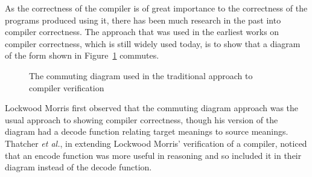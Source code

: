 \documentclass[a4paper,12pt]{article}
\begin{document}
As the correctness of the compiler is of great importance to the correctness of the programs produced using it, there has been much research in the past into compiler correctness.
The approach that was used in the earliest works on compiler correctness, which is still widely used today, is to show that a diagram of the form shown in Figure~\ref{commuting-diagram} commutes.
\begin{figure}
  \begin{center}
  \end{center}
  \caption{The commuting diagram used in the traditional approach to compiler verification}
  \label{commuting-diagram}
\end{figure}
Lockwood Morris\cite{morris1973} first observed that the commuting diagram approach was the usual approach to showing compiler correctness, though his version of the diagram had a decode function relating target meanings to source meanings.
Thatcher \emph{et al.}\cite{thatcher1979}, in extending Lockwood Morris' verification of a compiler, noticed that an encode function was more useful in reasoning and so included it in their diagram instead of the decode function.
\end{document}
